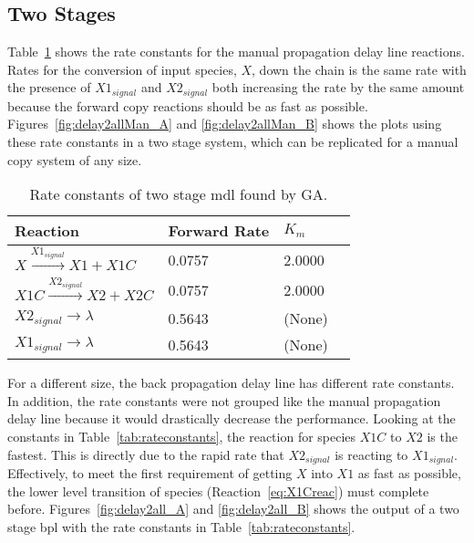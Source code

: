 \subsection{Two Stages}
Table~\ref{tab:rateconstantsMan} shows the rate constants for the manual propagation delay line reactions. Rates for the conversion of input species, $X$, down the chain is the same rate with the presence of $X1_{signal}$ and $X2_{signal}$ both increasing the rate by the same amount because the forward copy reactions should be as fast as possible. Figures~\ref{fig:delay2allMan_A} and \ref{fig:delay2allMan_B} shows the plots using these rate constants in a two stage system, which can be replicated for a manual copy system of any size.

\begin{table}[ht]
    \caption[Two Stage Manual Copy Delay Line Rate Constants]{Rate constants of two stage \gls{mdl} found by GA.}
    \label{tab:rateconstantsMan}
    \centering
    \begin{tabular}{llll}
	    Reaction                                 & Forward Rate & $K_m$          \\ \hline
	    $X \xrightarrow{X1_{signal}} X1 + X1C$   & 0.0757       & 2.0000         \\
	    $X1C \xrightarrow{X2_{signal}} X2 + X2C$ & 0.0757       & 2.0000         \\
		$X2_{signal} \rightarrow \lambda$        & 0.5643       & (None)         \\
	    $X1_{signal} \rightarrow \lambda$        & 0.5643       & (None)         \\
    \end{tabular}
\end{table}

For a different size, the back propagation delay line has different rate constants. In addition, the rate constants were not grouped like the manual propagation delay line because it would drastically decrease the performance. Looking at the constants in Table~\ref{tab:rateconstants}, the reaction for species $X1C$ to $X2$ is the fastest. This is directly due to the rapid rate that $X2_{signal}$ is reacting to $X1_{signal}$. Effectively, to meet the first requirement of getting $X$ into $X1$ as fast as possible, the lower level transition of species (Reaction~\ref{eq:X1Creac}) must complete before. Figures~\ref{fig:delay2all_A} and \ref{fig:delay2all_B} shows the output of a two stage \gls{bpl} with the rate constants in Table~\ref{tab:rateconstants}.

